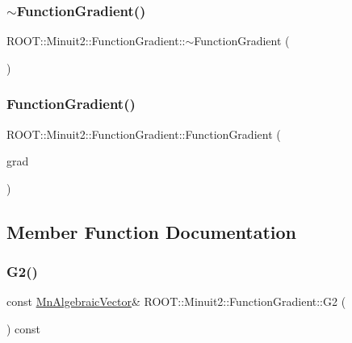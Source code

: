 \subsubsection{\texorpdfstring{$\sim$FunctionGradient()}{~FunctionGradient()}\hspace{0.1cm}{\footnotesize\ttfamily [3/3]}}
{\footnotesize\ttfamily R\+O\+O\+T\+::\+Minuit2\+::\+Function\+Gradient\+::$\sim$\+Function\+Gradient (\begin{DoxyParamCaption}{ }\end{DoxyParamCaption})\hspace{0.3cm}{\ttfamily [inline]}}

\mbox{\label{classROOT_1_1Minuit2_1_1FunctionGradient_ad21f4d36683bacc95bf2dfe74fe4d205}} 
\subsubsection{\texorpdfstring{FunctionGradient()}{FunctionGradient()}\hspace{0.1cm}{\footnotesize\ttfamily [12/12]}}
{\footnotesize\ttfamily R\+O\+O\+T\+::\+Minuit2\+::\+Function\+Gradient\+::\+Function\+Gradient (\begin{DoxyParamCaption}\item[{const \mbox{\hyperlink{classROOT_1_1Minuit2_1_1FunctionGradient}{Function\+Gradient}} \&}]{grad }\end{DoxyParamCaption})\hspace{0.3cm}{\ttfamily [inline]}}



\subsection{Member Function Documentation}
\mbox{\label{classROOT_1_1Minuit2_1_1FunctionGradient_a6f99988a7fd1a61ed96c6709f02b6041}} 
\subsubsection{\texorpdfstring{G2()}{G2()}\hspace{0.1cm}{\footnotesize\ttfamily [1/3]}}
{\footnotesize\ttfamily const \mbox{\hyperlink{namespaceROOT_1_1Minuit2_a62ed97730a1ca8d3fbaec64a19aa11c9}{Mn\+Algebraic\+Vector}}\& R\+O\+O\+T\+::\+Minuit2\+::\+Function\+Gradient\+::\+G2 (\begin{DoxyParamCaption}{ }\end{DoxyParamCaption}) const\hspace{0.3cm}{\ttfamily [inline]}}

